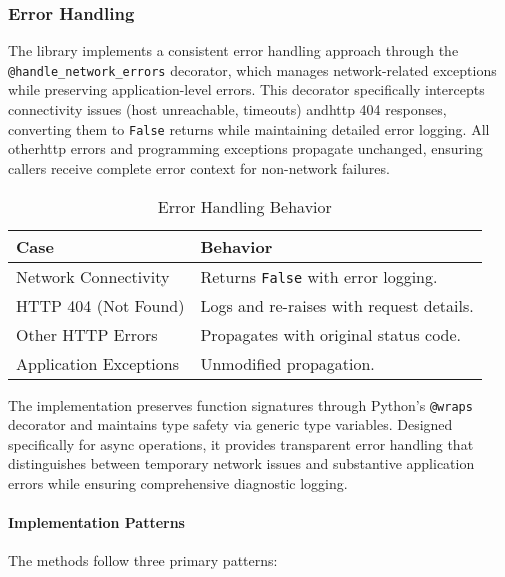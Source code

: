         \subsubsection{Error Handling}
            The library implements a consistent error handling approach through the \texttt{@handle\_network\_errors} 
            decorator, which manages network-related exceptions while preserving application-level errors. This 
            decorator specifically intercepts connectivity issues (host unreachable, timeouts) and\ac{http} 404 
            responses, converting them to \texttt{False} returns while maintaining detailed error logging. All 
            other\ac{http} errors and programming exceptions propagate unchanged, ensuring callers receive 
            complete error context for non-network failures.

            \begin{table}[h]
                \centering
                \caption{Error Handling Behavior}
                \label{tab:error-handling}
                \begin{tabular}{@{}lp{9cm}@{}}  %
                    \toprule
                    \textbf{Case} & \textbf{Behavior} \\
                    \midrule
                    Network Connectivity & Returns \texttt{False} with error logging. \\
                    HTTP 404 (Not Found) & Logs and re-raises with request details. \\
                    Other HTTP Errors & Propagates with original status code. \\
                    Application Exceptions & Unmodified propagation. \\
                    \bottomrule
                \end{tabular}
            \end{table}
        
            The implementation preserves function signatures through Python's \texttt{@wraps} decorator and 
            maintains type safety via generic type variables. Designed specifically for async operations, it 
            provides transparent error handling that distinguishes between temporary network issues and substantive 
            application errors while ensuring comprehensive diagnostic logging.

            
            \paragraph{Implementation Patterns}
                The methods follow three primary patterns:
                
